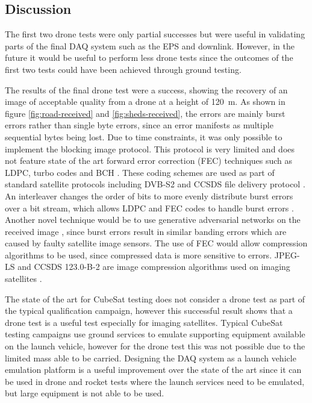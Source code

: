 \documentclass[]{report}
\begin{document}
\subsection{Discussion}

The first two drone tests were only partial successes but were useful in validating parts of the final DAQ system such as the EPS and downlink. However, in the future it would be useful to perform less drone tests since the outcomes of the first two tests could have been achieved through ground testing.

The results of the final drone test were a success, showing the recovery of an image of acceptable quality from a drone at a height of \SI{120}{\metre}. As shown in figure \ref{fig:road-received} and \ref{fig:sheds-received}, the errors are mainly burst errors rather than single byte errors, since an error manifests as multiple sequential bytes being lost. Due to time constraints, it was only possible to implement the blocking image protocol. This protocol is very limited and does not feature state of the art forward error correction (FEC) techniques such as LDPC, turbo codes and BCH \cite{10224067}. These coding schemes are used as part of standard satellite protocols including DVB-S2 and CCSDS file delivery protocol \cite{10224067}. An interleaver changes the order of bits to more evenly distribute burst errors over a bit stream, which allows LDPC and FEC codes to handle burst errors \cite{sonali2021capacity}. Another novel technique would be to use generative adversarial networks on the received image \cite{10131946}, since burst errors result in similar banding errors which are caused by faulty satellite image sensors. The use of FEC would allow compression algorithms to be used, since compressed data is more sensitive to errors. JPEG-LS and CCSDS 123.0-B-2 are image compression algorithms used on imaging satellites \cite{9352211}.

The state of the art for CubeSat testing does not consider a drone test as part of the typical qualification campaign, however this successful result shows that a drone test is a useful test especially for imaging satellites. Typical CubeSat testing campaigns use ground services to emulate supporting equipment available on the launch vehicle, however for the drone test this was not possible due to the limited mass able to be carried. Designing the DAQ system as a launch vehicle emulation platform is a useful improvement over the state of the art since it can be used in drone and rocket tests where the launch services need to be emulated, but large equipment is not able to be used.
\end{document}
